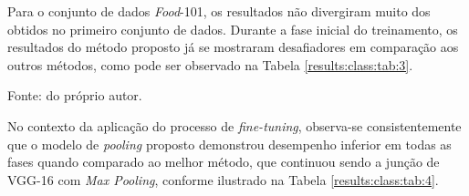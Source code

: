 Para o conjunto de dados \textit{Food}-101, os resultados não divergiram muito dos obtidos no primeiro conjunto de dados. Durante a fase inicial do treinamento, os resultados do método proposto já se mostraram desafiadores em comparação aos outros métodos, como pode ser observado na Tabela \ref{results:class:tab:3}.

\begin{table}[H]
    \centering
    \caption{Resultados da fase de aquecimento de VGG-16 aplicada no conjunto de dados \textit{Food}-101.}
    \label{results:class:tab:3}

    \vspace*{1 cm}
    Fonte: do próprio autor.
\end{table}

No contexto da aplicação do processo de \textit{fine-tuning}, observa-se consistentemente que o modelo de \textit{pooling} proposto demonstrou desempenho inferior em todas as fases quando comparado ao melhor método, que continuou sendo a junção de VGG-16 com \textit{Max Pooling}, conforme ilustrado na Tabela \ref{results:class:tab:4}.


